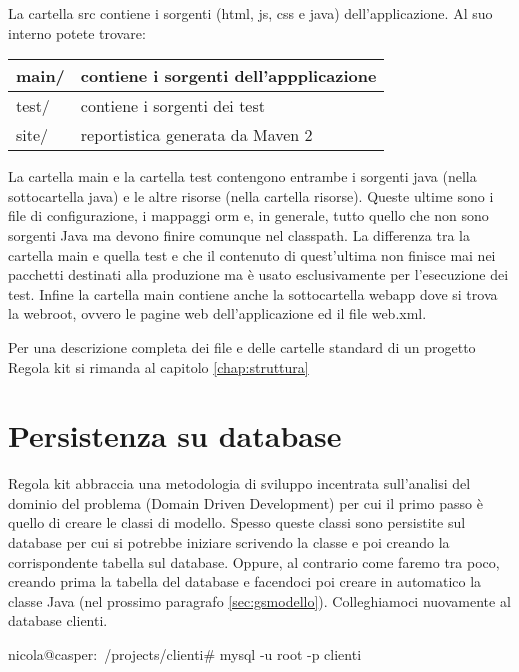 La cartella src contiene i sorgenti (html, js, css e java) dell'applicazione. Al suo interno potete trovare:

\begin{center}
{
  \begin{tabular}{ | l | p{9cm} | }
  \hline
  main/ & contiene i sorgenti dell'appplicazione \\ \hline
  test/ & contiene i sorgenti dei test \\ \hline
  site/ & reportistica generata da Maven 2  \\ \hline
  \end{tabular}
}
\end{center}

La cartella main e la cartella test contengono entrambe i sorgenti java (nella sottocartella java) e le altre risorse (nella cartella risorse). Queste ultime sono i file di configurazione, i mappaggi orm e, in generale, tutto quello che non sono sorgenti Java ma devono finire comunque nel classpath. La differenza tra la cartella main e quella test e che il contenuto di quest'ultima non finisce mai nei pacchetti destinati alla produzione ma è usato esclusivamente per l'esecuzione dei test.
Infine la cartella main contiene anche la sottocartella webapp dove si trova la webroot, ovvero le pagine web dell'applicazione ed il file web.xml.

\begin{nota}
Per una descrizione completa dei file e delle cartelle standard di un progetto Regola kit si rimanda al capitolo \vref{chap:struttura}
\end{nota}


\section{Persistenza su database}

Regola kit abbraccia una metodologia di sviluppo incentrata sull'analisi del dominio del problema (Domain Driven Development) per cui il primo passo è quello di creare le classi di modello. Spesso queste classi sono persistite sul database per cui si potrebbe iniziare scrivendo la classe e poi creando la corrispondente tabella sul database. Oppure, al contrario come faremo tra poco, creando prima la tabella del database e facendoci poi creare in automatico la classe Java (nel prossimo paragrafo \vref{sec:gsmodello}). Colleghiamoci nuovamente al database clienti.

\begin{bash}
nicola@casper:~/projects/clienti# mysql -u root -p clienti
\end{bash}

